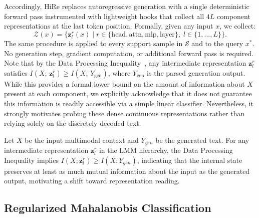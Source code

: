 \documentclass[sigconf,review,anonymous,9pt,table]{acmart}
\begin{document}
Accordingly, HiRe replaces autoregressive generation with a single deterministic forward pass instrumented with lightweight hooks that collect all $4L$ component representations at the last token position. Formally, given any input $x$, we collect:
\begin{equation}
  \mathcal{Z}(x) = \bigl\{ \mathbf{z}_l^r(x) \;\big|\; r \in \{\text{head}, \text{attn}, \text{mlp}, \text{layer}\},\; l \in \{1, \ldots, L\} \bigr\}.
\end{equation}
The same procedure is applied to every support sample in $\mathcal{S}$ and to the query $x^*$.
No generation step, gradient computation, or additional forward pass is required.
Note that by the Data Processing Inequality~\cite{cover2006elements}, any intermediate representation $\mathbf{z}_l^r$ satisfies $I(X;\,\mathbf{z}_l^r) \geq I(X;\, Y_{\text{gen}})$, where $Y_{\text{gen}}$ is the parsed generation output. While this provides a formal lower bound on the amount of information about $X$ present at each component, we explicitly acknowledge that it does not guarantee this information is readily accessible via a simple linear classifier. Nevertheless, it strongly motivates probing these dense continuous representations rather than relying solely on the discretely decoded text.

\begin{proposition}
\label{prop:dpi}
Let $X$ be the input multimodal context and $Y_{gen}$ be the generated text. For any intermediate representation $\mathbf{z}_l^r$ in the LMM hierarchy, the Data Processing Inequality implies $I(X; \mathbf{z}_l^r) \geq I(X; Y_{gen})$, indicating that the internal state preserves at least as much mutual information about the input as the generated output, motivating a shift toward representation reading.
\end{proposition}

\subsection{Regularized Mahalanobis Classification}
\end{document}
